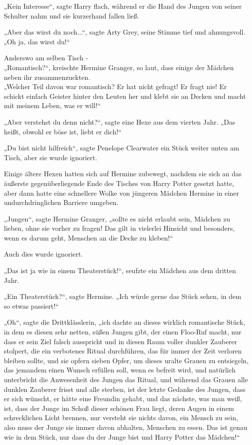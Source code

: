 {„Kein Interesse“, sagte Harry flach, während er die Hand des Jungen von seiner Schulter nahm und sie kurzerhand fallen ließ.

„Aber das wirst du noch...“, sagte Arty Grey, seine Stimme tief und ahnungsvoll. „Oh ja, das wirst du!“

Anderswo am selben Tisch -\\ „Romantisch?“, kreischte Hermine Granger, so laut, dass einige der Mädchen neben ihr zusammenzuckten.\\ „Welcher Teil davon war romantisch? Er hat nicht gefragt! Er fragt nie! Er schickt einfach Geister hinter den Leuten her und klebt sie an Decken und macht mit meinem Leben, was er will!“

„Aber verstehst du denn nicht?“, sagte eine Hexe aus dem vierten Jahr. „Das heißt, obwohl er böse ist, liebt er dich!“

„Du bist nicht hilfreich“, sagte Penelope Clearwater ein Stück weiter unten am Tisch, aber sie wurde ignoriert.

Einige ältere Hexen hatten sich auf Hermine zubewegt, nachdem sie sich an das äußerste gegenüberliegende Ende des Tisches von Harry Potter gesetzt hatte, aber dann hatte eine schnellere Wolke von jüngeren Mädchen Hermine in einer undurchdringlichen Barriere umgeben.

„Jungen“, sagte Hermine Granger, „sollte es nicht erlaubt sein, Mädchen zu lieben, ohne sie vorher zu fragen! Das gilt in vielerlei Hinsicht und besonders, wenn es darum geht, Menschen an die Decke zu kleben!“

Auch dies wurde ignoriert.

„Das ist ja wie in einem Theaterstück!“, seufzte ein Mädchen aus dem dritten Jahr.

„Ein Theaterstück?“, sagte Hermine. „Ich würde gerne das Stück sehen, in dem so etwas passiert!“

„Oh“, sagte die Drittklässlerin, „ich dachte an dieses wirklich romantische Stück, in dem es diesen sehr netten, süßen Jungen gibt, der einen Floo-Ruf macht, nur dass er sein Ziel falsch ausspricht und in diesen Raum voller dunkler Zauberer stolpert, die ein verbotenes Ritual durchführen, das für immer der Zeit verloren bleiben sollte, und sie opfern sieben Opfer, um dieses uralte Grauen zu entsiegeln, das jemandem einen Wunsch erfüllen soll, wenn es befreit wird, und natürlich unterbricht die Anwesenheit des Jungen das Ritual, und während das Grauen alle dunklen Zauberer frisst und alle sterben, ist der letzte Gedanke des Jungen, dass er sich wünscht, er hätte eine Freundin gehabt, und das nächste, was man weiß, ist, dass der Junge im Schoß dieser schönen Frau liegt, deren Augen in einem schrecklichen Licht brennen, nur versteht sie nichts davon, ein Mensch zu sein, also muss der Junge sie immer davon abhalten, Menschen zu essen. Das ist genau wie in dem Stück, nur dass du der Junge bist und Harry Potter das Mädchen!“

}
